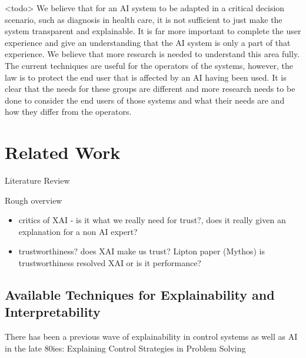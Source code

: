 \documentclass[manuscript,screen,review]{acmart}
\begin{document}
<todo> We believe that for an AI system to be adapted in a critical decision scenario, such as diagnosis in health care, it is not sufficient to just make the system transparent and explainable. It is far more important to complete the user experience and give an understanding that the AI system is only a part of that experience. We believe that more research is needed to understand this area fully.\\
The current techniques are useful for the operators of the systems, however, the law is to protect the end user that is affected by an AI having been used. It is clear that the needs for these groups are different and more research needs to be done to consider the end users of those systems and what their needs are and how they differ from the operators.\\


\section{Related Work}\label{sec:related-work}
Literature Review

Rough overview
\begin{itemize}
    \item critics of XAI - is it what we really need for trust?, does it really given an explanation for a non AI expert? 
    \item trustworthiness? does XAI make us trust? Lipton paper (Mythos) is trustworthiness resolved XAI or is it performance?
\end{itemize}

\subsection{Available Techniques for Explainability and Interpretability}
There has been a previous wave of explainability in control systems as well as AI in the late 80ies: Explaining Control Strategies in Problem Solving\cite{Chandrasekaran1989}
\end{document}
